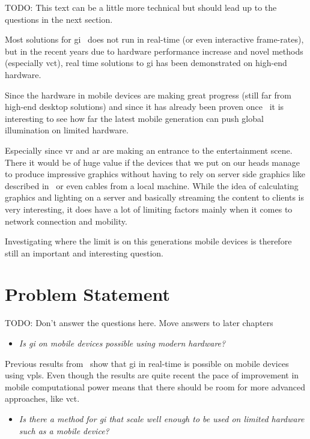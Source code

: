 TODO: This text can be a little more technical but should lead up to the questions in the next section.

Most solutions for \gls{gi}~\cite{sotagi} does not run in real-time (or even interactive frame-rates), but in the recent years due to hardware performance increase and novel methods (especially \gls{vct}), real time solutions to \gls{gi} has been demonstrated on high-end hardware. 

Since the hardware in mobile devices are making great progress (still far from high-end desktop solutions) and since it has already been proven once~\cite{gimobile} it is interesting to see how far the latest mobile generation can push global illumination on limited hardware.

Especially since \gls{vr} and \gls{ar} are making an entrance to the entertainment scene.
There it would be of huge value if the devices that we put on our heads manage to produce impressive graphics without having to rely on server side graphics like described in~\cite{cloudlight} or even cables from a local machine. 
While the idea of calculating graphics and lighting on a server and basically streaming the content to clients is very interesting, it does have a lot of limiting factors mainly when it comes to network connection and mobility.

Investigating where the limit is on this generations mobile devices is therefore still an important and interesting question.

\section{Problem Statement}

TODO: Don't answer the questions here. Move answers to later chapters

\begin{itemize}
  \item \textit{Is \acrlong{gi} on mobile devices possible using modern hardware?}
\end{itemize}

Previous results from~\cite{gimobile} show that \gls{gi} in real-time is possible on mobile devices using \glspl{vpl}. 
Even though the results are quite recent the pace of improvement in mobile computational power means that there should be room for more advanced approaches, like \gls{vct}.

\begin{itemize}
  \item \textit{Is there a method for \acrlong{gi} that scale well enough to be used on limited hardware such as a mobile device?}
\end{itemize}

